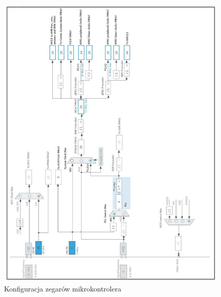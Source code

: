 \documentclass[10pt, a4paper]{article}
\begin{document}
\newpage
\begin{figure}[H]
	\centering
	\includegraphics[width=\textwidth]{konfiguracja_clk.png}
	\caption{Konfiguracja zegarów mikrokontrolera}
	\label{fig:KonfiguracjaZegara}
\end{figure}

\newpage
\end{document}
